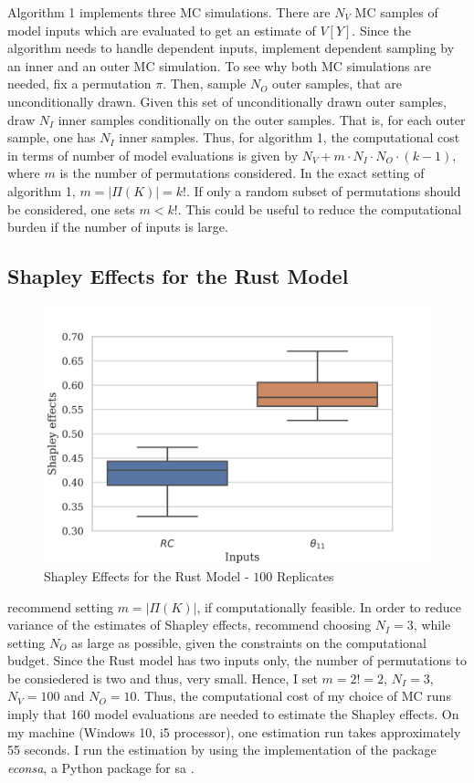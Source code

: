 Algorithm 1 implements three MC simulations. There are $N_V$ MC samples of model inputs which are evaluated to get an estimate of $V[Y]$. Since the algorithm needs to handle dependent inputs, \citet{SNS16} implement dependent sampling by an inner and an outer MC simulation. To see why both MC simulations are needed, fix a permutation $\pi$. Then, sample $N_O$ outer samples, that are unconditionally drawn. Given this set of unconditionally drawn outer samples, draw $N_I$ inner samples conditionally on the outer samples. That is, for each outer sample, one has $N_I$ inner samples. Thus, for algorithm 1, the computational cost in terms of number of model evaluations is given by $N_V+m \cdot N_I \cdot N_O \cdot (k-1)$, where $m$ is the number of permutations considered. In the exact setting of algorithm 1, $m=\vert \Pi(K) \vert=k!$. If only a random subset of permutations should be considered, one sets $m<k!$. This could be useful to reduce the computational burden if the number of inputs is large.

\subsection{Shapley Effects for the Rust Model}

\begin{figure}[t]
	\caption{Shapley Effects for the Rust Model - $100$ Replicates}
    \label{boxplot_shapley}
	\vspace*{-4mm}
	\centering
	\includegraphics[scale=0.9]{../figures/boxplot_shapley_effects_100.png}
\end{figure}

\citet{SNS16} recommend setting $m=\vert \Pi(K) \vert$, if computationally feasible. In order to reduce variance of the estimates of Shapley effects, \citet{SNS16} recommend choosing $N_I=3$, while setting $N_O$ as large as possible, given the constraints on the computational budget. Since the Rust model has two inputs only, the number of permutations to be consiedered is two and thus, very small. Hence, I set $m=2!=2$, $N_I=3$, $N_V=100$ and $N_O=10$. Thus, the computational cost of my choice of MC runs imply that 160 model evaluations are needed to estimate the Shapley effects. On my machine (Windows 10, i5 processor), one estimation run takes approximately 55 seconds. I run the estimation by using the implementation of the package \textit{econsa}, a Python package for sa \citep{OSE21}.

